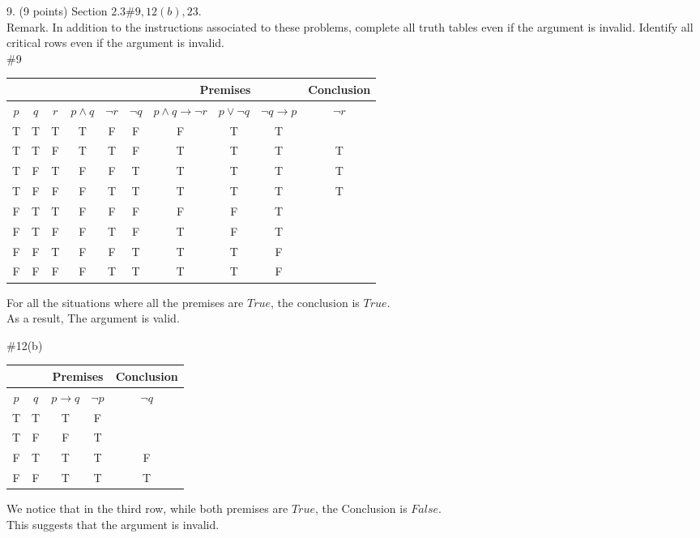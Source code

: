 \documentclass{article}
\begin{document}
9. (9 points) Section $2.3 \# 9,12(b), 23$.\\
Remark. In addition to the instructions associated to these problems, complete all truth tables even if the argument is invalid. Identify all critical rows even if the argument is invalid.\\
\#9\\
\begin{center}
    \begin{tabular}{|c|c|c|c|c|c|c|c|c|c|}
\hline
\multicolumn{3}{|c|}{} & \multicolumn{3}{|c|}{} & \multicolumn{3}{|c|}{Premises} & \multicolumn{1}{|c|}{Conclusion} \\
\hline
$p$ & $q$ & $r$ & $p \wedge q$ & $\neg r$ & $\neg q$ & $p \wedge q \rightarrow \neg r $&$ p \vee \neg q$ & $\neg q \rightarrow p$ & $\neg r$\\

\hline
T & T & T & T & F & F & F & T & T &  \\
T & T & F & T & T & F & T & T & T & T \\
T & F & T & F & F & T & T & T & T & T \\
T & F & F & F & T & T & T & T & T & T \\
F & T & T & F & F & F & F & F & T &  \\
F & T & F & F & T & F & T & F & T &  \\
F & F & T & F & F & T & T & T & F &  \\
F & F & F & F & T & T & T & T & F & \\
\hline
\end{tabular}
\end{center}
For all the situations where all the premises are $True$, the conclusion is $True$.\\ 
As a result, The argument is valid.

\#12(b)\\
\begin{center}
    \begin{tabular}{|c|c|c|c|c|}
    \hline
    \multicolumn{2}{|c|}{} &\multicolumn{2}{|c|}{Premises} &\multicolumn{1}{|c|}{Conclusion}\\
    \hline
        $p$ & $q$ & $p \rightarrow q$ & $\neg p$ & $\neg q$ \\
    \hline
        T & T & T & F &    \\
        T & F & F & T &    \\
        F & T & T & T & F  \\
        F & F & T & T & T  \\
    \hline
    \end{tabular}
\end{center}
We notice that in the third row, while both premises are $True$, the Conclusion is $False$.\\
This suggests that the argument is invalid.
\end{document}
